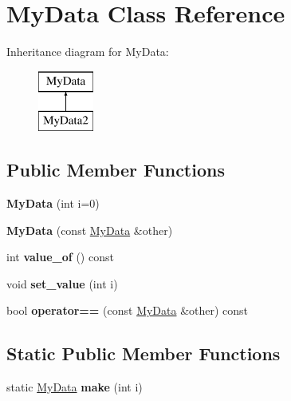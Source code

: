 \hypertarget{classMyData}{}\section{My\+Data Class Reference}
\label{classMyData}
Inheritance diagram for My\+Data\+:\begin{figure}[H]
\begin{center}
\leavevmode
\includegraphics[height=2.000000cm]{classMyData}
\end{center}
\end{figure}
\subsection*{Public Member Functions}
\begin{DoxyCompactItemize}
\item 
\hypertarget{classMyData_a18891e9aebdb8dd97026c9cfb8088d59}{}{\bfseries My\+Data} (int i=0)\label{classMyData_a18891e9aebdb8dd97026c9cfb8088d59}

\item 
\hypertarget{classMyData_a487bcb9b39d2e301cb4a491310b74ae9}{}{\bfseries My\+Data} (const \hyperlink{classMyData}{My\+Data} \&other)\label{classMyData_a487bcb9b39d2e301cb4a491310b74ae9}

\item 
\hypertarget{classMyData_a0cf046f0cfcfc15af7a400ad9f323b2d}{}int {\bfseries value\+\_\+of} () const \label{classMyData_a0cf046f0cfcfc15af7a400ad9f323b2d}

\item 
\hypertarget{classMyData_a45da50afffb1f1bd335db33cbd2e4931}{}void {\bfseries set\+\_\+value} (int i)\label{classMyData_a45da50afffb1f1bd335db33cbd2e4931}

\item 
\hypertarget{classMyData_abfa19cc62518be68675b22d115a38d86}{}bool {\bfseries operator==} (const \hyperlink{classMyData}{My\+Data} \&other) const \label{classMyData_abfa19cc62518be68675b22d115a38d86}

\end{DoxyCompactItemize}
\subsection*{Static Public Member Functions}
\begin{DoxyCompactItemize}
\item 
\hypertarget{classMyData_a90e2bd26b79068617b830ac800637c17}{}static \hyperlink{classMyData}{My\+Data} {\bfseries make} (int i)\label{classMyData_a90e2bd26b79068617b830ac800637c17}

\end{DoxyCompactItemize}
